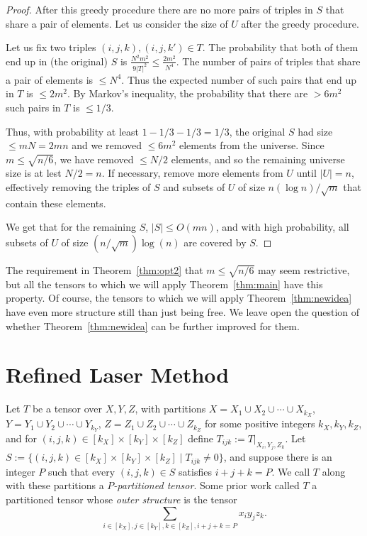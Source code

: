 \documentclass{theoretics}
\begin{document}
\begin{proof}
After this greedy procedure there are no more pairs of triples in $S$ that share a pair of elements.
Let us consider the size of $U$ after the greedy procedure.

Let us fix two triples $(i,j,k),(i,j,k')\in T$. The probability that both of them end up in (the original) $S$ is $\frac{N^2 m^2}{9|T|^2}\leq \frac{2m^2}{N^4}$. The number of pairs of triples that share a pair of elements is $\leq N^4$. Thus the expected number of such pairs that end up in $T$ is $\leq 2m^2$.
By Markov's inequality, the probability that there are $> 6m^2$ such pairs in $T$ is $\leq 1/3$. 

Thus, with probability at least $1-1/3-1/3 = 1/3$, the original $S$ had size $\leq mN=2mn$ and we removed $\leq 6m^2$ elements from the universe. Since $m\leq \sqrt{n/6}$, we have removed $\leq N/2$ elements, and so the remaining universe size is at lest $N/2=n$. 
If necessary, remove more elements from $U$ until $|U|=n$, effectively removing the triples of $S$ and subsets of $U$ of size $n(\log n)/\sqrt m$ that contain these elements.

We get that for the remaining $S$,  $|S|\leq O(mn)$, and with high probability, all subsets of $U$ of size $(n/\sqrt{m})\log (n)$ are covered by $S$.
\end{proof}

The requirement in Theorem~\ref{thm:opt2} that $m \leq \sqrt{n/6}$ may seem restrictive, but all the tensors to which we will apply Theorem~\ref{thm:main} have this property. Of course, the tensors to which we will apply Theorem~\ref{thm:newidea} have even more structure still than just being free. We leave open the question of whether Theorem~\ref{thm:newidea} can be further improved for them.





\section{Refined Laser Method} \label{sec:proof}

Let $T$ be a tensor over $X,Y,Z$, with partitions $X = X_1 \cup X_2 \cup \cdots \cup X_{k_X}$, $Y = Y_1 \cup Y_2 \cup \cdots \cup Y_{k_Y}$, $Z = Z_1 \cup Z_2 \cup \cdots \cup Z_{k_Z}$ for some positive integers $k_X,k_Y,k_Z$, and for $(i,j,k) \in [k_X]\times[k_Y]\times[k_Z]$ define $T_{ijk} := T|_{X_i,Y_j,Z_k}$. Let $S := \{ (i,j,k) \in [k_X]\times[k_Y]\times[k_Z] \mid T_{ijk} \neq 0\}$, and suppose there is an integer $P$ such that every $(i,j,k) \in S$ satisfies $i+j+k=P$. We call $T$ along with these partitions a \emph{$P$-partitioned tensor}. Some prior work called $T$ a partitioned tensor whose \emph{outer structure} is the tensor $$\sum_{i \in [k_X], j\in [k_Y], k \in [k_Z], i+j+k=P} x_iy_jz_k.$$
\end{document}

